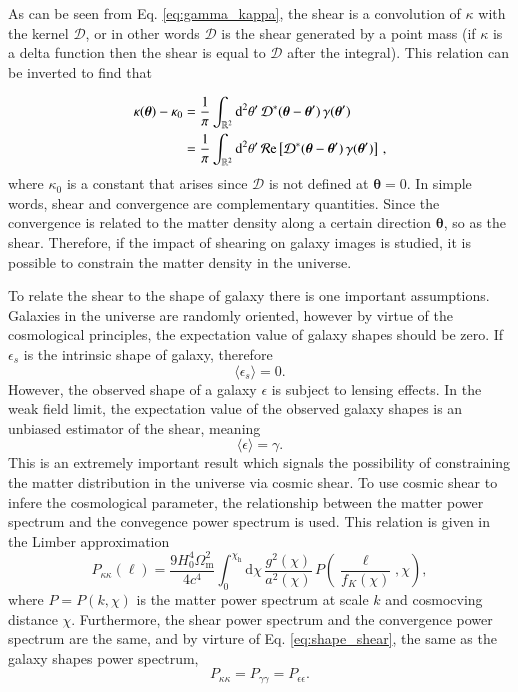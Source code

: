 As can be seen from Eq. \ref{eq:gamma_kappa}, the shear is a convolution of $\kappa$ with the kernel $\mathcal{D}$, or in other words $\mathcal{D}$ is the shear generated by a point mass (if $\kappa$ is a delta function then the shear is equal to $\mathcal{D}$ after the integral). This relation can be inverted to find that

\begin{align}
\kappa(\boldsymbol{\theta}) - \kappa_0 &= \frac{1}{\pi} \int_{\mathbb{R}^2} \mathrm{d}^2\theta' \, \mathcal{D}^*(\boldsymbol{\theta} - \boldsymbol{\theta}') \, \gamma(\boldsymbol{\theta}') \notag \\
&= \frac{1}{\pi} \int_{\mathbb{R}^2} \mathrm{d}^2\theta' \, \mathcal{R}\mathrm{e} \left[ \mathcal{D}^*(\boldsymbol{\theta} - \boldsymbol{\theta}') \, \gamma(\boldsymbol{\theta}') \right] \, ,
\end{align}
where $\kappa_0$ is a constant that arises since $\mathcal{D}$ is not defined at $\boldsymbol{\theta} = 0$. In simple words, shear and convergence are complementary quantities. Since the convergence is related to the matter density along a certain direction $\boldsymbol{\theta}$, so as the shear. Therefore, if the impact of shearing on galaxy images is studied, it is possible to constrain the matter density in the universe.

To relate the shear to the shape of galaxy there is one important assumptions. Galaxies in the universe are randomly oriented, however by virtue of the cosmological principles, the expectation value of galaxy shapes should be zero. If $\epsilon_s$ is the intrinsic shape of galaxy, therefore
\begin{equation}
    \langle \epsilon_s \rangle = 0.
\end{equation}
However, the observed shape of a galaxy $\epsilon$ is subject to lensing effects. In the weak field limit, the expectation value of the observed galaxy shapes is an unbiased estimator of the shear, meaning 
\begin{equation} \label{eq:shape_shear}
    \langle \epsilon \rangle = \gamma.
\end{equation}
This is an extremely important result which signals the possibility of constraining the matter distribution in the universe via cosmic shear. To use cosmic shear to infere the cosmological parameter, the relationship between the matter power spectrum and the convegence power spectrum is used. This relation is given in the Limber approximation 
\begin{equation}\label{eq:convergence_ps}
    P_{\kappa \kappa} (\ell) = \frac{9H_0^4 \Omega_{\mathrm{m}}^2}{4c^4} \int_0^{\chi_{\mathrm{h}}} \mathrm{d}\chi \, \frac{g^2(\chi)}{a^2(\chi)} \, P \!\left(\frac{\ell}{f_K(\chi)}, \chi\right),
\end{equation}
where $P = P(k, \chi)$ is the matter power spectrum at scale $k$ and cosmocving distance $\chi$. Furthermore, the shear power spectrum and the convergence power spectrum are the same, and by virture of Eq. \ref{eq:shape_shear}, the same as the galaxy shapes power spectrum,
\begin{equation}
    P_{\kappa \kappa} = P_{\gamma \gamma} = P_{\epsilon \epsilon}.
\end{equation}

